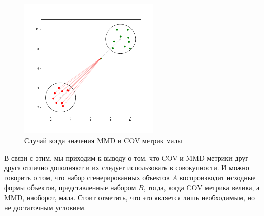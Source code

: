 \begin{figure}[h]
\centering
    \includegraphics[width=0.6\textwidth]{images/MMD-COV-problem-2.png}
    \caption{Случай когда значения MMD и COV метрик малы}
    \label{fig:mmdcov2}
\end{figure}

В связи с этим, мы приходим к выводу о том, что COV и MMD метрики друг-друга отлично дополняют и их следует использовать в совокупности. И можно говорить о том, что набор сгенерированных объектов $A$ воспроизводит исходные формы объектов, представленные набором $B$, тогда, когда COV метрика велика, а MMD, наоборот, мала. Стоит отметить, что это является лишь необходимым, но не достаточным условием.